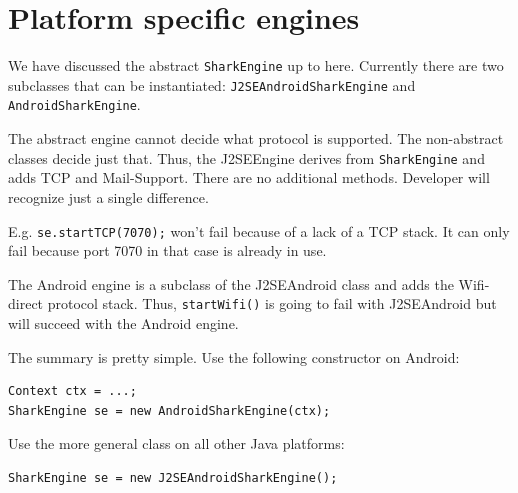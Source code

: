 \section{Platform specific engines}
We have discussed the abstract {\tt SharkEngine} up to here. Currently there are two subclasses that can be instantiated: {\tt J2SEAndroidSharkEngine} and {\tt AndroidSharkEngine}.

The abstract engine cannot decide what protocol is supported. The non-abstract classes decide just that. Thus, the J2SEEngine derives from {\tt SharkEngine} and adds TCP and Mail-Support. There are no additional methods. Developer will recognize just a single difference.

E.g. {\tt se.startTCP(7070);} won't fail because of a lack of a TCP stack.
It can only fail because port 7070 in that case is already in use.

The Android engine is a subclass of the J2SEAndroid class and adds the Wifi-direct protocol stack. Thus, {\tt startWifi()} is going to fail with J2SEAndroid but will succeed with the Android engine.

The summary is pretty simple. Use the following constructor on Android:

\begin{verbatim}
Context ctx = ...;
SharkEngine se = new AndroidSharkEngine(ctx);
\end{verbatim}

Use the more general class on all other Java platforms:

\begin{verbatim}
SharkEngine se = new J2SEAndroidSharkEngine();
\end{verbatim}
